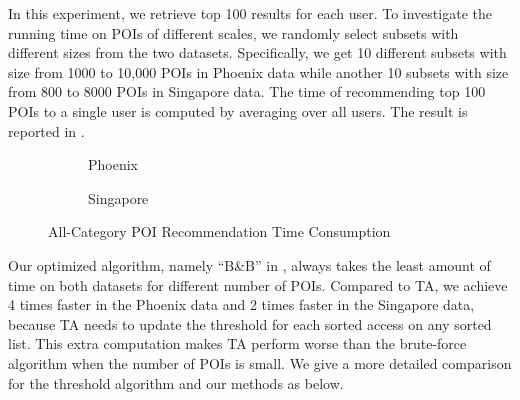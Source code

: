 In this experiment, we retrieve top 100 results for each user.
To investigate the running time on POIs of different
scales, we randomly select subsets with different sizes from the two datasets.
Specifically, we get 10 different subsets with size from 1000 to 10,000 POIs in Phoenix data
while another 10 subsets with size from 800 to 8000 POIs in Singapore data.
The time of recommending
top 100 POIs to a single user is computed by averaging over all users. The result is
reported in .
\begin{figure}[th]
\begin{subfigure}[t]{0.49\columnwidth}
\centering
{}
\caption{Phoenix}
\end{subfigure}
\begin{subfigure}[t]{0.49\columnwidth}
\centering
{}
\caption{Singapore}
\end{subfigure}
\caption{All-Category POI Recommendation Time Consumption}
\label{fig:time}
\end{figure}

Our optimized algorithm, namely ``B\&B'' in , always takes the least amount of time
on both datasets for different number of POIs.
Compared to TA, we achieve 4 times faster in the Phoenix data and 2 times faster in the Singapore data,
because
TA needs to update the threshold for each sorted access on
any sorted list. This extra computation makes TA perform worse than the brute-force
algorithm when the number of POIs is small. We give a more detailed
comparison for the threshold algorithm and our methods as below.

